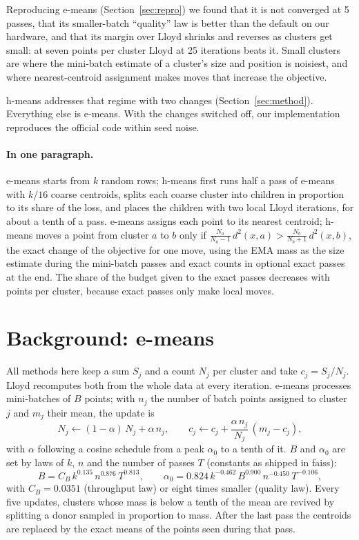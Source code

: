 \documentclass[11pt]{article}
\newcommand{\hm}{h-means}
\newcommand{\emeans}{e-means}
\begin{document}
Reproducing \emeans{} (Section~\ref{sec:repro}) we found that it is not converged at 5 passes, that its smaller-batch ``quality'' law is better than the default on our hardware, and that its margin over Lloyd shrinks and reverses as clusters get small: at seven points per cluster Lloyd at 25 iterations beats it. Small clusters are where the mini-batch estimate of a cluster's size and position is noisiest, and where nearest-centroid assignment makes moves that increase the objective.

\hm{} addresses that regime with two changes (Section~\ref{sec:method}). Everything else is \emeans. With the changes switched off, our implementation reproduces the official code within seed noise.

\paragraph{In one paragraph.} \emeans{} starts from $k$ random rows; \hm{} first runs half a pass of \emeans{} with $k/16$ coarse centroids, splits each coarse cluster into children in proportion to its share of the loss, and places the children with two local Lloyd iterations, for about a tenth of a pass. \emeans{} assigns each point to its nearest centroid; \hm{} moves a point from cluster $a$ to $b$ only if $\frac{N_a}{N_a-1}\,d^2(x,a) > \frac{N_b}{N_b+1}\,d^2(x,b)$, the exact change of the objective for one move, using the EMA mass as the size estimate during the mini-batch passes and exact counts in optional exact passes at the end. The share of the budget given to the exact passes decreases with points per cluster, because exact passes only make local moves.

\section{Background: \emeans{}}
\label{sec:emeans}

All methods here keep a sum $S_j$ and a count $N_j$ per cluster and take $c_j = S_j/N_j$. Lloyd recomputes both from the whole data at every iteration. \emeans{} processes mini-batches of $B$ points; with $n_j$ the number of batch points assigned to cluster $j$ and $m_j$ their mean, the update is
\begin{equation}
N_j \leftarrow (1-\alpha)\,N_j + \alpha\, n_j, \qquad c_j \leftarrow c_j + \frac{\alpha\, n_j}{N_j}\,(m_j - c_j),
\end{equation}
with $\alpha$ following a cosine schedule from a peak $\alpha_0$ to a tenth of it. $B$ and $\alpha_0$ are set by laws of $k$, $n$ and the number of passes $T$ (constants as shipped in faiss):
\begin{equation}
B = C_B\, k^{0.135}\, n^{0.876}\, T^{0.813}, \qquad \alpha_0 = 0.824\, k^{-0.462}\, B^{0.900}\, n^{-0.450}\, T^{-0.106},
\end{equation}
with $C_B = 0.0351$ (throughput law) or eight times smaller (quality law). Every five updates, clusters whose mass is below a tenth of the mean are revived by splitting a donor sampled in proportion to mass. After the last pass the centroids are replaced by the exact means of the points seen during that pass.
\end{document}
